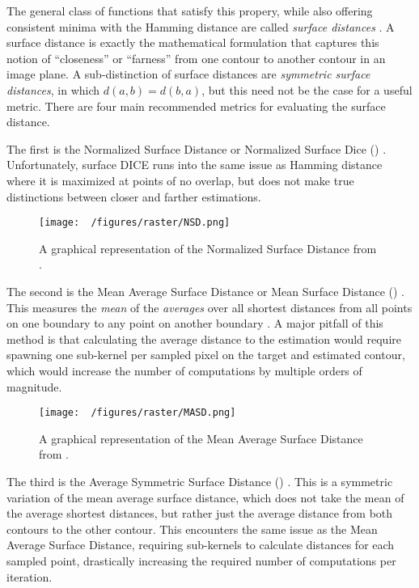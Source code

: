 The general class of functions that satisfy this propery, while also offering consistent minima with the Hamming distance are called \textit{surface distances} \cite{reinkeCommonLimitationsImage2023,reinkeUnderstandingMetricrelatedPitfalls2023}.
A surface distance is exactly the mathematical formulation that captures this notion of ``closeness'' or ``farness'' from one contour to another contour in an image plane.
A sub-distinction of surface distances are \emph{symmetric surface distances}, in which $d(a,b) = d(b,a)$, but this need not be the case for a useful metric.
There are four main recommended metrics for evaluating the surface distance.

The first is the Normalized Surface Distance or Normalized Surface Dice () \cite{nikolovClinicallyApplicableSegmentation2021} .
Unfortunately, surface DICE runs into the same issue as Hamming distance where it is maximized at points of no overlap, but does not make true distinctions between closer and farther estimations.

\begin{figure}[h!]
  \centering
  \texttt{[image: ~/figures/raster/NSD.png]}
  \caption{A graphical representation of the Normalized Surface Distance from \cite{reinkeUnderstandingMetricrelatedPitfalls2023,reinkeCommonLimitationsImage2023}.}
  \label{fig:surfDICE}
\end{figure}

The second is the Mean Average Surface Distance or Mean Surface Distance () \cite{benesPerformanceEvaluationImage2015}.
This measures the \emph{mean} of the \emph{averages} over all shortest distances from all points on one boundary to any point on another boundary \cite{reinkeCommonLimitationsImage2023,reinkeUnderstandingMetricrelatedPitfalls2023}.
A major pitfall of this method is that calculating the average distance to the estimation would require spawning one sub-kernel per sampled pixel on the target and estimated contour, which would increase the number of computations by multiple orders of magnitude.

\begin{figure}[h!]
  \centering
  \texttt{[image: ~/figures/raster/MASD.png]}
  \caption{A graphical representation of the Mean Average Surface Distance from \cite{reinkeCommonLimitationsImage2023,reinkeUnderstandingMetricrelatedPitfalls2023}.}
  \label{fig:MASD}
\end{figure}

The third is the Average Symmetric Surface Distance () \cite{yeghiazaryanFamilyBoundaryOverlap2018}.
This is a symmetric variation of the mean average surface distance, which does not take the mean of the average shortest distances, but rather just the average distance from both contours to the other contour.
This encounters the same issue as the Mean Average Surface Distance, requiring sub-kernels to calculate distances for each sampled point, drastically increasing the required number of computations per iteration.

